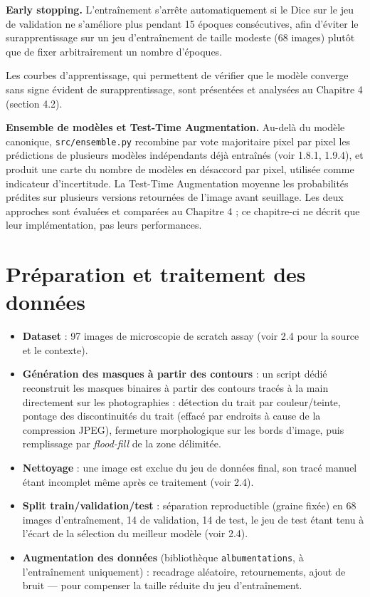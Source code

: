 \documentclass[12pt,a4paper]{report}
\begin{document}
\textbf{Early stopping.} L'entraînement s'arrête automatiquement si le Dice sur le jeu de validation ne s'améliore plus pendant 15 époques consécutives, afin d'éviter le surapprentissage sur un jeu d'entraînement de taille modeste (68 images) plutôt que de fixer arbitrairement un nombre d'époques.

Les courbes d'apprentissage, qui permettent de vérifier que le modèle converge sans signe évident de surapprentissage, sont présentées et analysées au Chapitre 4 (section 4.2).

\textbf{Ensemble de modèles et Test-Time Augmentation.} Au-delà du modèle canonique, \texttt{src/ensemble.py} recombine par vote majoritaire pixel par pixel les prédictions de plusieurs modèles indépendants déjà entraînés (voir 1.8.1, 1.9.4), et produit une carte du nombre de modèles en désaccord par pixel, utilisée comme indicateur d'incertitude. La Test-Time Augmentation moyenne les probabilités prédites sur plusieurs versions retournées de l'image avant seuillage. Les deux approches sont évaluées et comparées au Chapitre 4 ; ce chapitre-ci ne décrit que leur implémentation, pas leurs performances.

\section{Préparation et traitement des données}

\begin{itemize}
\item \textbf{Dataset} : 97 images de microscopie de scratch assay (voir 2.4 pour la source et le contexte).
\item \textbf{Génération des masques à partir des contours} : un script dédié reconstruit les masques binaires à partir des contours tracés à la main directement sur les photographies : détection du trait par couleur/teinte, pontage des discontinuités du trait (effacé par endroits à cause de la compression JPEG), fermeture morphologique sur les bords d'image, puis remplissage par \textit{flood-fill} de la zone délimitée.
\item \textbf{Nettoyage} : une image est exclue du jeu de données final, son tracé manuel étant incomplet même après ce traitement (voir 2.4).
\item \textbf{Split train/validation/test} : séparation reproductible (graine fixée) en 68 images d'entraînement, 14 de validation, 14 de test, le jeu de test étant tenu à l'écart de la sélection du meilleur modèle (voir 2.4).
\item \textbf{Augmentation des données} (bibliothèque \texttt{albumentations}, à l'entraînement uniquement) : recadrage aléatoire, retournements, ajout de bruit --- pour compenser la taille réduite du jeu d'entraînement.
\end{itemize}
\end{document}
